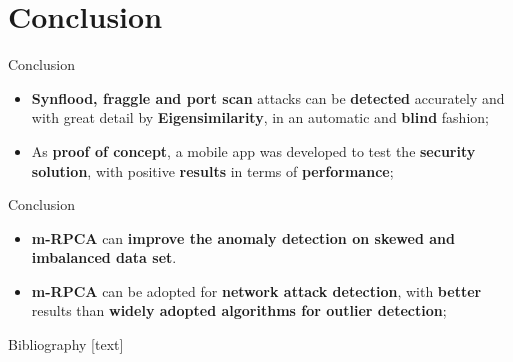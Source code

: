 \documentclass[newPxFont, numfooter, sectionpages]{beamer}
\begin{document}
\section{Conclusion}

\begin{frame}[c]{Conclusion}
	\begin{itemize}
		\item \textbf{Synflood, fraggle and port scan} attacks can be \textbf{detected} accurately and with great detail by \textbf{Eigensimilarity}, in an automatic and \textbf{blind} fashion;
		\item As \textbf{proof of concept}, a mobile app was developed to test the \textbf{security solution}, with positive \textbf{results} in terms of \textbf{performance};
	\end{itemize}
\end{frame}

\begin{frame}[c]{Conclusion}
	\begin{itemize}
		\item \textbf{m-RPCA} can \textbf{improve the anomaly detection on skewed and imbalanced data set}. 
		\item \textbf{m-RPCA} can be adopted for \textbf{network attack detection}, with \textbf{better} results than \textbf{widely adopted algorithms for outlier detection}; 
	\end{itemize}
\end{frame}

\begin{frame}{Bibliography}
	[text]
	\printbibliography
\end{frame}
\end{document}
